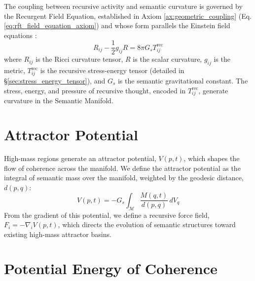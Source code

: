 The coupling between recursive activity and semantic curvature is governed by the Recurgent Field Equation, established in Axiom \ref{ax:geometric_coupling} (Eq. \ref{eq:rft_field_equation_axiom}) and whose form parallels the Einstein field equations \autocite{Einstein1915, MisnerThorneWheeler1973, Wald1984}:
\begin{equation}
R_{ij} - \frac{1}{2}g_{ij}R = 8\pi G_s T^{\text{rec}}_{ij}
\end{equation}
where \(R_{ij}\) is the Ricci curvature tensor, \(R\) is the scalar curvature, \(g_{ij}\) is the metric, \(T^{\text{rec}}_{ij}\) is the recursive stress-energy tensor (detailed in \S\ref{sec:stress_energy_tensor}), and \(G_s\) is the semantic gravitational constant. The stress, energy, and pressure of recursive thought, encoded in \(T^{\text{rec}}_{ij}\), generate curvature in the Semantic Manifold.


\section{Attractor Potential}\label{sec:attractor_potential}

High-mass regions generate an attractor potential, \(V(p,t)\), which shapes the flow of coherence across the manifold. We define the attractor potential as the integral of semantic mass over the manifold, weighted by the geodesic distance, \(d(p, q)\):
\begin{equation}
V(p, t) = -G_s \int_{\mathcal{M}} \frac{M(q, t)}{d(p, q)} \, dV_q
\end{equation}
From the gradient of this potential, we define a recursive force field, \(F_i = -\nabla_i V(p,t)\), which directs the evolution of semantic structures toward existing high-mass attractor basins.


\section{Potential Energy of Coherence}\label{sec:potential_energy_of_coherence}

